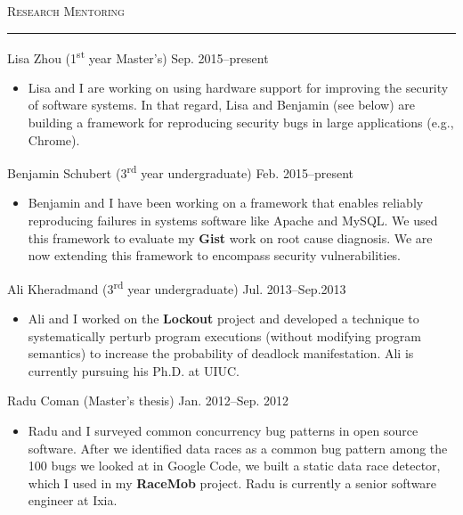 \documentclass[10pt]{article}
\newcommand{\mysec}[1]{\vspace{2em}\textsc{\large #1}\vspace{1mm}\hrule\vspace{2mm}}
\newcommand{\myssub}[1]{\hspace*{2mm}\parbox{163mm}{#1}\vspace*{2mm}}
\begin{document}
\newpage

\mysec{Research Mentoring}

\myssub{\vspace{2mm}Lisa Zhou (1\textsuperscript{st} year Master's) \hfill Sep. 2015--present
\begin{itemize}
\setlength\itemsep{0em}
\item{Lisa and I are working on using hardware support for improving the security of software systems. In that regard, Lisa and Benjamin (see below) are building a framework for reproducing security bugs in large applications (e.g., Chrome).}
\end{itemize}
}

\myssub{Benjamin Schubert (3\textsuperscript{rd} year undergraduate) \hfill Feb. 2015--present
\begin{itemize}
\setlength\itemsep{0em}
\item{Benjamin and I have been working on a framework that enables reliably reproducing failures in systems software like Apache and MySQL. We used this framework to evaluate my \textbf{Gist} work on root cause diagnosis. We are now extending this framework to encompass security vulnerabilities.}
\end{itemize}
}

\myssub{Ali Kheradmand (3\textsuperscript{rd} year undergraduate) \hfill Jul. 2013--Sep.2013
\begin{itemize}
\setlength\itemsep{0em}
\item{Ali and I worked on the \textbf{Lockout} project and developed a technique to systematically perturb program executions (without modifying program semantics) to increase the probability of deadlock manifestation. Ali is currently pursuing his Ph.D. at UIUC.}
\end{itemize}
}

\myssub{Radu Coman (Master's thesis) \hfill Jan. 2012--Sep. 2012
\begin{itemize}
\setlength\itemsep{0em}
\item{Radu and I surveyed common concurrency bug patterns in open source software. After we identified data races as a common bug pattern among the 100 bugs we looked at in Google Code, we built a static data race detector, which I used in my \textbf{RaceMob} project. Radu is currently a senior software engineer at Ixia.}
\end{itemize}
}

\end{document}
